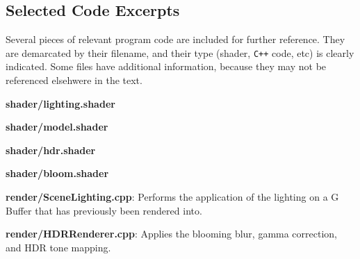 \documentclass[11pt, oneside]{report}
\begin{document}
\begin{appendices}
	\makeatletter
	\makeatother
	
	\chapter{Selected Code Excerpts}
Several pieces of relevant program code are included for further reference. They are demarcated by their filename, and their type (shader, \texttt{C++} code, etc) is clearly indicated. Some files have additional information, because they may not be referenced elsehwere in the text.

	\textbf{shader/lighting.shader}
	
	
	\textbf{shader/model.shader}
	
	
	\textbf{shader/hdr.shader}
	
	
	\textbf{shader/bloom.shader}
	
	
	\textbf{render/SceneLighting.cpp}:
	Performs the application of the lighting on a \gls{G Buffer} that has previously been rendered into.
	
	
	
	\newpage
	\textbf{render/HDRRenderer.cpp}:
	Applies the blooming blur, gamma correction, and \gls{HDR} \gls{tone mapping}.
	
	

	\end{appendices}
\end{document}
